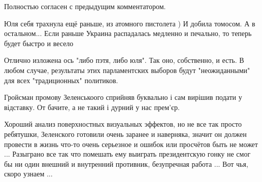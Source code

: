 \begin{itemize}
Полностью согласен с предыдущим комментатором.


Юля себя трахнула ещё раньше, из атомного пистолета ) И добила томосом. А в
остальном... Если раньше Украина распадалась медленно и печально, то теперь
будет быстро и весело


Отлично изложена ось "либо пэтя, либо юля". Так оно, собственно, и есть.
В любом случае, результаты этих парламентских выборов будут "неожиданными" для всех "традиционных" политиков.


Гройсман промову Зеленськоого сприйняв буквально і сам вирішив подати у відставку. От бачите, а не такий і дурний у нас прем’єр.


Хороший анализ поверхностных визуальных эффектов, но не все так просто
ребятушки, Зеленского готовили очень заранее и наверняка, значит он должен
провести в жизнь что-то очень серьезное и ошибок или просчётов быть не может
... Разыграно все так что помешать ему выиграть президентскую гонку не смог бы
ни один внешний и внутренний противник, безупречная работа ... Вот чья, скоро
узнаем ...

\end{itemize} %
